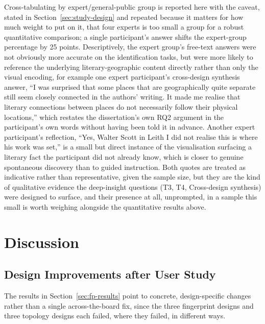 \documentclass[logo,msc]{infthesis}
\begin{document}
Cross-tabulating by expert/general-public group is reported here with the caveat, stated in Section~\ref{sec:study-design} and repeated because it matters for how much weight to put on it, that four experts is too small a group for a robust quantitative comparison; a single participant's answer shifts the expert-group percentage by 25 points. Descriptively, the expert group's free-text answers were not obviously more accurate on the identification tasks, but were more likely to reference the underlying literary-geographic content directly rather than only the visual encoding, for example one expert participant's cross-design synthesis answer, ``I was surprised that some places that are geographically quite separate still seem closely connected in the authors' writing. It made me realise that literary connections between places do not necessarily follow their physical locations,'' which restates the dissertation's own RQ2 argument in the participant's own words without having been told it in advance. Another expert participant's reflection, ``Yes, Walter Scott in Leith I did not realise this is where his work was set,'' is a small but direct instance of the visualisation surfacing a literary fact the participant did not already know, which is closer to genuine spontaneous discovery than to guided instruction. Both quotes are treated as indicative rather than representative, given the sample size, but they are the kind of qualitative evidence the deep-insight questions (T3, T4, Cross-design synthesis) were designed to surface, and their presence at all, unprompted, in a sample this small is worth weighing alongside the quantitative results above.
 
 
\chapter{Discussion}
\label{chap:discussion}
 
\section{Design Improvements after User Study}

The results in Section~\ref{sec:fp-results} point to concrete, design-specific changes rather than a single across-the-board fix, since the three fingerprint designs and three topology designs each failed, where they failed, in different ways.
\end{document}
